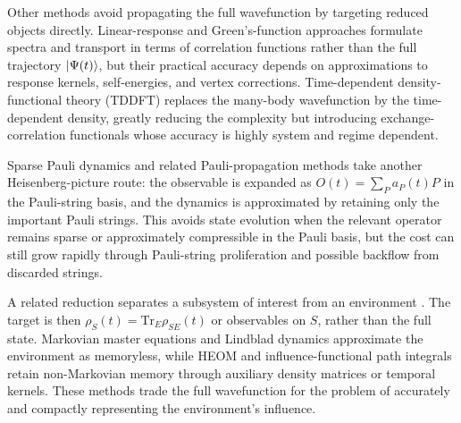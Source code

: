 \documentclass[12pt]{article}
\begin{document}
Other methods avoid propagating the full wavefunction by targeting reduced objects directly. Linear-response and Green's-function approaches \cite{fetterQuantumTheoryManyparticle2003} formulate spectra and transport in terms of correlation functions rather than the full trajectory \(\ket{\Psi(t)}\), but their practical accuracy depends on approximations to response kernels, self-energies, and vertex corrections. Time-dependent density-functional theory (TDDFT) \cite{rungeDensityFunctionalTheoryTimeDependent1984} replaces the many-body wavefunction by the time-dependent density, greatly reducing the complexity but introducing exchange-correlation functionals whose accuracy is highly system and regime dependent. 

Sparse Pauli dynamics and related Pauli-propagation methods \cite{rallSimulationQubitQuantum2019, begusicFastConvergedClassical2024a, begusicRealTimeOperatorEvolution2025, rudolphPauliPropagationComputational2025} take another Heisenberg-picture route: the observable is expanded as \(O(t)=\sum_P a_P(t)P\) in the Pauli-string basis, and the dynamics is approximated by retaining only the important Pauli strings. This avoids state evolution when the relevant operator remains sparse or approximately compressible in the Pauli basis, but the cost can still grow rapidly through Pauli-string proliferation and possible backflow from discarded strings.

A related reduction separates a subsystem of interest from an environment \cite{breuerTheoryOpenQuantum2002, nakajimaQuantumTheoryTransport1958a, zwanzigEnsembleMethodTheory1960}. The target is then \(\rho_S(t)=\mathrm{Tr}_E\rho_{SE}(t)\) or observables on \(S\), rather than the full state. Markovian master equations and Lindblad dynamics \cite{goriniCompletelyPositiveDynamical1976, lindbladGeneratorsQuantumDynamical1976a} approximate the environment as memoryless, while HEOM \cite{tanimuraTimeEvolutionQuantum1989, tanimuraNumericallyExactApproach2020} and influence-functional path integrals \cite{feynmanTheoryGeneralQuantum1963, makriNumericalPathIntegral1995} retain non-Markovian memory through auxiliary density matrices or temporal kernels. These methods trade the full wavefunction for the problem of accurately and compactly representing the environment's influence.
\end{document}
